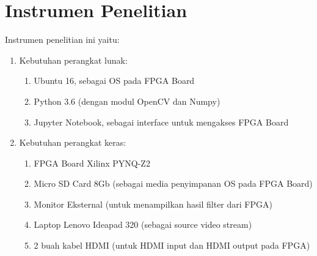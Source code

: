 \section{Instrumen Penelitian}
Instrumen penelitian ini yaitu:
\begin{enumerate}[topsep=0pt,itemsep=0pt,partopsep=0pt, parsep=0pt]
    \item Kebutuhan perangkat lunak:
    \begin{enumerate}[topsep=0pt,itemsep=0pt,partopsep=0pt, parsep=0pt, label={\alph*.}]
        \item Ubuntu 16, sebagai OS pada FPGA Board
        \item Python 3.6 (dengan modul OpenCV dan Numpy)
        \item Jupyter Notebook, sebagai interface untuk mengakses FPGA Board 
    \end{enumerate}
    \item Kebutuhan perangkat keras:
    \begin{enumerate}[topsep=0pt,itemsep=0pt,partopsep=0pt, parsep=0pt, label={\alph*.}]
        \item FPGA Board Xilinx PYNQ-Z2
        \item Micro SD Card 8Gb (sebagai media penyimpanan OS pada FPGA Board)
        \item Monitor Eksternal (untuk menampilkan hasil filter dari FPGA)
        \item Laptop Lenovo Ideapad 320 (sebagai source video stream)
        \item 2 buah kabel HDMI (untuk HDMI input dan HDMI output pada FPGA) 
    \end{enumerate}
\end{enumerate}
